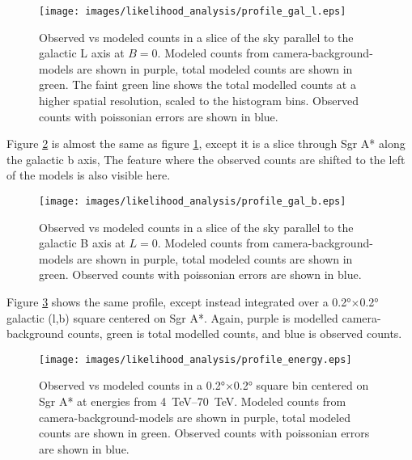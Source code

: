   \begin{figure}[h]
    \centering
    \texttt{[image: images/likelihood\_analysis/profile\_gal\_l.eps]}
    \caption[Galactic Center Profile vs Galactic L]{
      Observed vs modeled counts in a slice of the sky parallel to the galactic L axis at $B=0$.
      Modeled counts from camera-background-models are shown in purple, total modeled counts are shown in green.
      The faint green line shows the total modelled counts at a higher spatial resolution, scaled to the histogram bins.
      Observed counts with poissonian errors are shown in blue.
    }
    \label{fig:gc_profile_gal_l}
  \end{figure}

  Figure \ref{fig:gc_profile_gal_b} is almost the same as figure \ref{fig:gc_profile_gal_l}, except it is a slice through Sgr A* along the galactic b axis,
  The feature where the observed counts are shifted to the left of the models is also visible here.

  \begin{figure}[h]
    \centering
    \texttt{[image: images/likelihood\_analysis/profile\_gal\_b.eps]}
    \caption[Galactic Center Profile vs Galactic B]{
      Observed vs modeled counts in a slice of the sky parallel to the galactic B axis at $L=0$.
      Modeled counts from camera-background-models are shown in purple, total modeled counts are shown in green.
      Observed counts with poissonian errors are shown in blue.
    }
    \label{fig:gc_profile_gal_b}
  \end{figure}

  Figure \ref{fig:gc_profile_energy} shows the same profile, except instead integrated over a \ang{0.2}$\times$\ang{0.2} galactic (l,b) square centered on Sgr A*.
  Again, purple is modelled camera-background counts, green is total modelled counts, and blue is observed counts.
  
  \begin{figure}[h]
    \centering
    \texttt{[image: images/likelihood\_analysis/profile\_energy.eps]}
    \caption[Galactic Center Profile vs Energy]{
      Observed vs modeled counts in a \ang{0.2}$\times$\ang{0.2} square bin centered on Sgr A* at energies from \SIrange{4}{70}{TeV}.
      Modeled counts from camera-background-models are shown in purple, total modeled counts are shown in green.
      Observed counts with poissonian errors are shown in blue.
    }
    \label{fig:gc_profile_energy}
  \end{figure}
  
